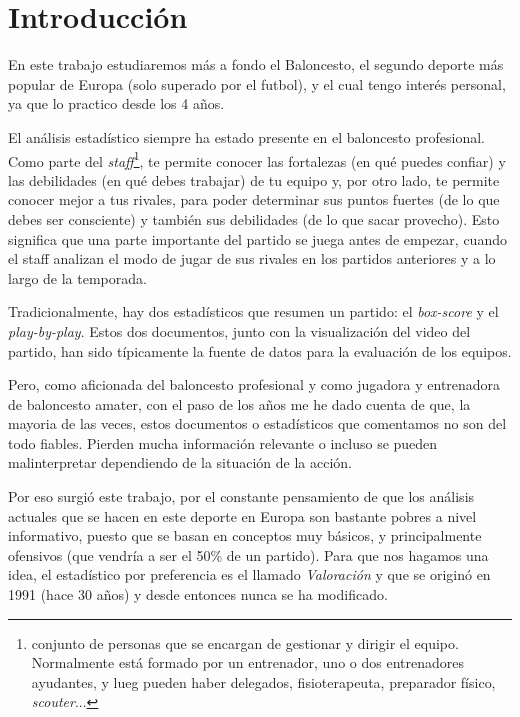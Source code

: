 \documentclass[paper=a4, fontsize=9pt]{article}
\begin{document}
\tableofcontents

\clearpage



\section{Introducción}


En este trabajo estudiaremos más a fondo el Baloncesto, el segundo deporte más popular de Europa (solo superado por el futbol), y el cual tengo interés personal, ya que lo practico desde los 4 años.

El análisis estadístico siempre ha estado presente en el baloncesto profesional. Como parte del \emph{staff}\footnote{conjunto de personas que se encargan de gestionar y dirigir el equipo. Normalmente está formado por un entrenador, uno o dos entrenadores ayudantes, y lueg pueden haber delegados, fisioterapeuta, preparador físico, \emph{scouter}...}, te permite conocer las fortalezas (en qué puedes confiar) y las debilidades (en qué debes trabajar) de tu equipo y, por otro lado, te permite conocer mejor a tus rivales, para poder determinar sus puntos fuertes (de lo que debes ser consciente) y también sus debilidades (de lo que sacar provecho). Esto significa que una parte importante del partido se juega antes de empezar, cuando el staff analizan el modo de jugar de sus rivales en los partidos anteriores y a lo largo de la temporada.

Tradicionalmente, hay dos estadísticos que resumen un partido: el \emph{box-score} y el \emph{play-by-play}. Estos dos documentos, junto con la visualización del video del partido, han sido típicamente la fuente de datos para la evaluación de los equipos. 

Pero, como aficionada del baloncesto profesional y como jugadora y entrenadora de baloncesto amater, con el paso de los años me he dado cuenta de que, la mayoria de las veces, estos documentos o estadísticos que comentamos no son del todo fiables. Pierden mucha información relevante o incluso se pueden malinterpretar dependiendo de la situación de la acción.

Por eso surgió este trabajo, por el constante pensamiento de que los análisis actuales que se hacen en este deporte en Europa son bastante pobres a nivel informativo, puesto que se basan en conceptos muy básicos, y principalmente ofensivos (que vendría a ser el 50\% de un partido). Para que nos hagamos una idea, el estadístico por preferencia es el llamado \emph{Valoración} y que se originó en 1991 (hace 30 años) y desde entonces nunca se ha modificado.
\end{document}
